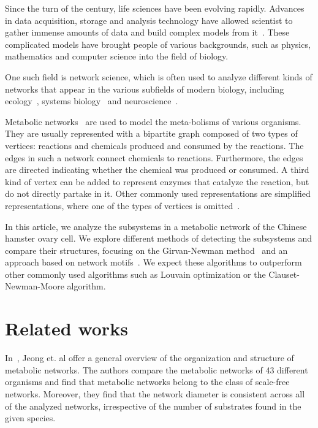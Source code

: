 Since the turn of the century, life sciences have been evolving
rapidly. Advances in data acquisition, storage and analysis technology have
allowed scientist to gather immense amounts of data and build complex models
from it~\cite{modsys}. These complicated models have brought people of various
backgrounds, such as physics, mathematics and computer science into the field
of biology.

One such field is network science, which
is often used to analyze different kinds of networks that appear in the various
subfields of modern biology, including ecology~\cite{proulx2005network}, systems
biology~\cite{barabasi2004network} and neuroscience~\cite{sporns2014contributions}.

Metabolic networks~\cite{jeong2000large} are used to model the meta-bolisms of
various organisms. They are usually represented with a bipartite graph composed
of two types of vertices: reactions and chemicals produced and consumed by the
reactions. The edges in such a network connect chemicals to
reactions. Furthermore, the edges are directed indicating whether the chemical
was produced or consumed. A third kind of vertex can be added to represent
enzymes that catalyze the reaction, but do not directly partake in
it. Other commonly used representations are simplified representations, where
one of the types of vertices is omitted~\cite{newman2010networks}.

In this article, we analyze the subsystems in a metabolic network of the Chinese
hamster ovary cell. We explore different methods of detecting the subsystems and
compare their structures, focusing on the Girvan-Newman
method~\cite{girvan2002community} and an approach based on network
motifs~\cite{benson2016higher}. We expect these algorithms to outperform other
commonly used algorithms such as Louvain optimization or the Clauset-Newman-Moore
algorithm.

\section{Related works}
\label{sec:related}

In~\cite{jeong2000large}, Jeong et. al offer a general overview of the
organization and structure of metabolic networks. The authors compare the
metabolic networks of 43 different organisms and find that metabolic networks
belong to the class of scale-free networks. Moreover, they find that the network
diameter is consistent across all of the analyzed networks, irrespective of the
number of substrates found in the given species.

